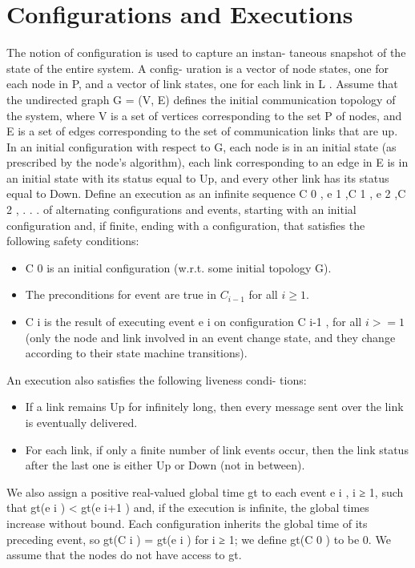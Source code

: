 \section{Configurations and Executions}
The notion of configuration is used to capture an instan-
taneous snapshot of the state of the entire system. A config-
uration is a vector of node states, one for each node in P,
and a vector of link states, one for each link in L .
Assume that the undirected graph G = (V, E) defines the
initial communication topology of the system, where V is a
set of vertices corresponding to the set P of nodes, and E
is a set of edges corresponding to the set of communication
links that are up. In an initial configuration with respect
to G, each node is in an initial state (as prescribed by the
node’s algorithm), each link corresponding to an edge in E
is in an initial state with its status equal to Up, and every
other link has its status equal to Down.
Define an execution as an infinite sequence
C 0 , e 1 ,C 1 , e 2 ,C 2 , . . . of alternating configurations and
events, starting with an initial configuration and, if finite,
ending with a configuration, that satisfies the following
safety conditions:
\begin{itemize}
\item C 0 is an initial configuration (w.r.t. some initial topology G).
\item The preconditions for event are true in $C_{i-1}$ for all $i\geq 1$.
\item C i is the result of executing event e i on configuration C i-1 , for all $i >= 1$ (only the node and link involved in an event change state, and they change according to their state machine transitions).
\end{itemize}

An execution also satisfies the following liveness condi-
tions:
\begin{itemize}
\item If a link remains Up for infinitely long, then every message sent over the link is eventually delivered.
\item For each link, if only a finite number of link events occur, then the link status after the last one is either Up or Down (not in between).
\end{itemize}

We also assign a positive real-valued global time gt to each event e i , i ≥ 1, such that gt(e i ) < gt(e i+1 ) and, if the execution is infinite, the global times increase without bound. Each configuration inherits the global time of its preceding event, so gt(C i ) = gt(e i ) for i ≥ 1; we define gt(C 0 ) to be 0. We assume that the nodes do not have access to gt.
